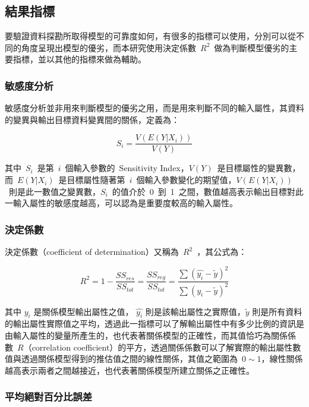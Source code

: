 \subsection{結果指標}

要驗證資料探勘所取得模型的可靠度如何，有很多的指標可以使用，分別可以從不同的角度呈現出模型的優劣，而本研究使用決定係數~$R^2$~做為判斷模型優劣的主要指標，並以其他的指標來做為輔助。

\subsubsection{敏感度分析}

敏感度分析並非用來判斷模型的優劣之用，而是用來判斷不同的輸入屬性，其資料的變異與輸出目標資料變異間的關係，定義為：

\begin{equation}  S_i = \dfrac{V(E(Y|X_i))}{V(Y)} \label{eq:sensitivy}\end{equation} 

其中~$S_i$~是第~$i$~個輸入參數的~Sensitivity Index，$V(Y)$~是目標屬性的變異數，而~$E(Y|X_i)$~是目標屬性隨著第~$i$~個輸入參數變化的期望值，$V(E(Y|X_i))$~則是此一數值之變異數，$S_i$~的值介於~0~到~1~之間，數值越高表示輸出目標對此一輸入屬性的敏感度越高，可以認為是重要度較高的輸入屬性。


\subsubsection{決定係數}

決定係數（coefficient of determination）又稱為~$R^2$~，其公式為：

\begin{equation} R^2 = 1 - \dfrac{SS_{res}}{SS_{tot}} = \dfrac{SS_{reg}}{SS_{tot}} = \dfrac{\sum{(\hat{y_i} - \tilde{y})^2}}{\sum{(y_i - \tilde{y})^2}} \label{eq:RSQ}\end{equation} 

其中 $y_i$ 是關係模型輸出屬性之值， $\hat{y_i}$ 則是該輸出屬性之實際值，$\tilde{y}$ 則是所有資料的輸出屬性實際值之平均，透過此一指標可以了解輸出屬性中有多少比例的資訊是由輸入屬性的變量所產生的，也代表著關係模型的正確性，而其值恰巧為關係係數\cite{aldrich1995correlations}~$R$（correlation coefficient）的平方，透過關係係數可以了解實際的輸出屬性數值與透過關係模型得到的推估值之間的線性關係，其值之範圍為~$0 \sim 1$，線性關係越高表示兩者之間越接近，也代表著關係模型所建立關係之正確性。

\subsubsection{平均絕對百分比誤差}

